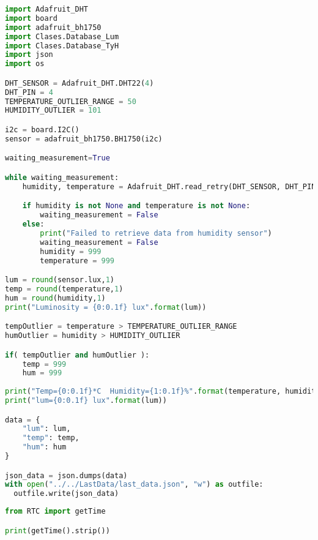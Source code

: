 \begin{lstlisting}[language=Python]
import Adafruit_DHT
import board
import adafruit_bh1750
import Clases.Database_Lum
import Clases.Database_TyH
import json
import os

DHT_SENSOR = Adafruit_DHT.DHT22(4)
DHT_PIN = 4
TEMPERATURE_OUTLIER_RANGE = 50
HUMIDITY_OUTLIER = 101

i2c = board.I2C()
sensor = adafruit_bh1750.BH1750(i2c)

waiting_measurement=True

while waiting_measurement:
    humidity, temperature = Adafruit_DHT.read_retry(DHT_SENSOR, DHT_PIN)

    if humidity is not None and temperature is not None:
        waiting_measurement = False
    else:
        print("Failed to retrieve data from humidity sensor")
        waiting_measurement = False
        humidity = 999
        temperature = 999

lum = round(sensor.lux,1)
temp = round(temperature,1)
hum = round(humidity,1)
print("Luminosity = {0:0.1f} lux".format(lum))

tempOutlier = temperature > TEMPERATURE_OUTLIER_RANGE
humOutlier = humidity > HUMIDITY_OUTLIER

if( tempOutlier and humOutlier ):
    temp = 999
    hum = 999
    
print("Temp={0:0.1f}*C  Humidity={1:0.1f}%".format(temperature, humidity))
print("lum={0:0.1f} lux".format(lum))

data = {
    "lum": lum,
    "temp": temp,
    "hum": hum
}

json_data = json.dumps(data)
with open("../../LastData/last_data.json", "w") as outfile:
  outfile.write(json_data)
\end{lstlisting}

\begin{lstlisting}[language=Python]
from RTC import getTime

print(getTime().strip())
\end{lstlisting}


